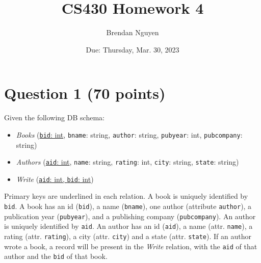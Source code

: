 \documentclass[letterpaper, 11pt]{article}
\title{CS430 Homework 4}
\author{Brendan Nguyen}
\date{Due: Thursday, Mar. 30, 2023}
\begin{document}
\maketitle

\section*{Question 1 (70 points)}

Given the following DB schema:
\begin{itemize}
    \item \textit{Books} (\ul{\texttt{bid}: int}, \texttt{bname}: string, \texttt{author}: string, \texttt{pubyear}: int, \texttt{pubcompany}: string)
    \item \textit{Authors} (\ul{\texttt{aid}: int}, \texttt{name}: string, \texttt{rating}: int, \texttt{city}: string, \texttt{state}: string)
    \item \textit{Write} (\ul{\texttt{aid}: int, \texttt{bid}: int})
\end{itemize}

Primary keys are underlined in each relation. A book is uniquely identified by \texttt{bid}. A book has an id (\texttt{bid}), a name (\texttt{bname}), one author (attribute \texttt{author}), a publication year (\texttt{pubyear}), and a publishing company (\texttt{pubcompany}). An author is uniquely identified by \texttt{aid}. An author has an id (\texttt{aid}), a name (attr. \texttt{name}), a rating (attr. \texttt{rating}), a city (attr. \texttt{city}) and a state (attr. \texttt{state}). If an author wrote a book, a record will be present in the \textit{Write} relation, with the \texttt{aid} of that author and the \texttt{bid} of that book. 
\end{document}
